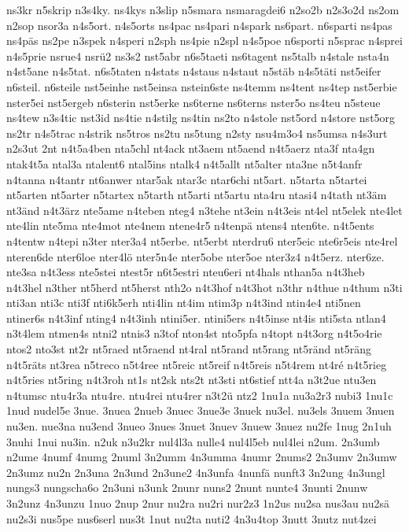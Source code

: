 {ns3kr
n5skrip
n3s4ky.
ns4kys
n3slip
n5smara
nsmaragdei6
n2so2b
n2s3o2d
ns2om
n2sop
nsor3a
n4s5ort.
n4s5orts
ns4pac
ns4pari
n4spark
ns6part.
n6sparti
ns4pas
ns4päs
ns2pe
n3spek
n4speri
n2sph
ns4pie
n2spl
n4s5poe
n6sporti
n5sprac
n4sprei
n4s5prie
nsrue4
nsrü2
ns3s2
nst5abr
n6s5taeti
ns6tagent
ns5talb
n4stale
nsta4n
n4st5ane
n4s5tat.
n6s5taten
n4stats
n4staus
n4staut
n5stäb
n4s5täti
nst5eifer
n6steil.
n6steile
nst5einhe
nst5einsa
nstein6ste
ns4temm
ns4tent
ns4tep
nst5erbie
nster5ei
nst5ergeb
n6sterin
nst5erke
ns6terne
ns6terns
nster5o
ns4teu
n5steue
ns4tew
n3s4tic
nst3id
ns4tie
n4stilg
ns4tin
ns2to
n4stole
nst5ord
n4store
nst5org
ns2tr
n4s5trac
n4strik
ns5tros
ns2tu
ns5tung
n2sty
nsu4m3o4
ns5umsa
n4s3urt
n2s3ut
2nt
n4t5a4ben
nta5chl
nt4ack
nt3aem
nt5aend
n4t5aerz
nta3f
nta4gn
ntak4t5a
ntal3a
ntalent6
ntal5ins
ntalk4
n4t5allt
nt5alter
nta3ne
n5t4anfr
n4tanna
n4tantr
nt6anwer
ntar5ak
ntar3c
ntar6chi
nt5art.
n5tarta
n5tartei
nt5arten
nt5arter
n5tartex
n5tarth
nt5arti
nt5artu
nta4ru
ntasi4
n4tath
nt3äm
nt3änd
n4t3ärz
nte5ame
n4teben
nteg4
n3tehe
nt3ein
n4t3eis
nt4el
nt5elek
nte4let
nte4lin
nte5ma
nte4mot
nte4nem
ntene4r5
n4tenpä
ntens4
nten6te.
n4t5ents
n4tentw
n4tepi
n3ter
nter3a4
nt5erbe.
nt5erbt
nterdru6
nter5eic
nte6r5eis
nte4rel
nteren6de
nter6loe
nter4lö
nter5n4e
nter5obe
nter5oe
nter3z4
n4t5erz.
nter6ze.
nte3sa
n4t3ess
nte5stei
ntest5r
n6t5estri
nteu6eri
nt4hals
nthan5a
n4t3heb
n4t3hel
n3ther
nt5herd
nt5herst
nth2o
n4t3hof
n4t3hot
n3thr
n4thue
n4thum
n3ti
nti3an
nti3c
nti3f
nti6k5erh
nti4lin
nt4im
ntim3p
n4t3ind
ntin4e4
nti5nen
ntiner6s
n4t3inf
nting4
n4t3inh
ntini5er.
ntini5ers
n4t5inse
nt4is
nti5sta
ntlan4
n3t4lem
ntmen4s
ntni2
ntnis3
n3tof
nton4st
nto5pfa
n4topt
n4t3org
n4t5o4rie
ntos2
nto3st
nt2r
nt5raed
nt5raend
nt4ral
nt5rand
nt5rang
nt5ränd
nt5räng
n4t5räts
nt3rea
n5treco
n5t4ree
nt5reic
nt5reif
n4t5reis
n5t4rem
nt4ré
n4t5rieg
n4t5ries
nt5ring
n4t3roh
nt1s
nt2sk
nts2t
nt3sti
nt6stief
ntt4a
n3t2ue
ntu3en
n4tumsc
ntu4r3a
ntu4re.
ntu4rei
ntu4rer
n3t2ü
ntz2
1nu1a
nu3a2r3
nubi3
1nu1c
1nud
nudel5e
3nue.
3nuea
2nueb
3nuec
3nue3e
3nuek
nu3el.
nu3els
3nuem
3nuen
nu3en.
nue3na
nu3end
3nueo
3nues
3nuet
3nuev
3nuew
3nuez
nu2fe
1nug
2n1uh
3nuhi
1nui
nu3in.
n2uk
n3u2kr
nul4l3a
nulle4
nul4l5eb
nul4lei
n2um.
2n3umb
n2ume
4numf
4numg
2numl
3n2umm
4n3umma
4numr
2nums2
2n3umv
2n3umw
2n3umz
nu2n
2n3una
2n3und
2n3une2
4n3unfa
4nunfä
nunft3
3n2ung
4n3ungl
nungs3
nungscha6o
2n3uni
n3unk
2nunr
nuns2
2nunt
nunte4
3nunti
2nunw
3n2unz
4n3unzu
1nuo
2nup
2nur
nu2ra
nu2ri
nur2z3
1n2us
nu2sa
nus3au
nu2sä
nu2s3i
nus5pe
nus6serl
nus3t
1nut
nu2ta
nuti2
4n3u4top
3nutt
3nutz
nut4zei
}
